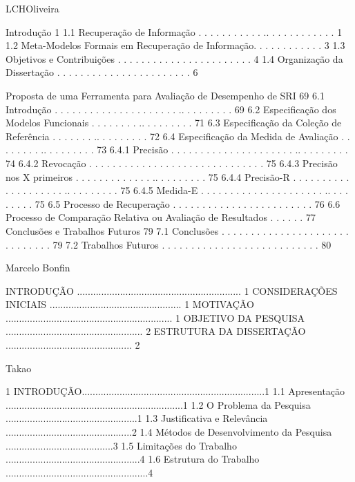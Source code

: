 LCHOliveira

Introdução 1
1.1 Recuperação de Informação . . . . . . . . . . . .. . . . . . . . . . . . 1
1.2 Meta-Modelos Formais em Recuperação de Informação. . . . . . . . . . . . 3
1.3 Objetivos e Contribuições  . . . . . . . . . . . . . . . . . . . . . . . 4
1.4 Organização da Dissertação . . . . . . . . . . . . . . . . . . . . . . . 6

Proposta de uma Ferramenta para Avaliação de Desempenho de SRI 69
6.1 Introdução . . . . . . . . . . . . . . . . . . . . . .. . . . . . . . . 69
6.2 Especificação dos Modelos Funcionais . . . . . . . . .. . . . . . . . . 71
6.3 Especificação da Coleção de Referência . . . . . . . .. . . . . . . . . 72
6.4 Especificação da Medida de Avaliação . . . . . . . . .. . . . . . . . . 73
6.4.1 Precisão . . . . . . . . . . . . . . . . . . . . . .. . . . . . . . . 74
6.4.2 Revocação . . . . . . . . . . . . . . . . . . . . . . . . . . . . . . 75
6.4.3 Precisão nos X primeiros . . . . . . . . . . . . . .. . . . . . . . . 75
6.4.4 Precisão-R . . . . . . . . . . . . . . . . . . . . .. . . . . . . . . 75
6.4.5 Medida-E . . . . . . . . . . . . . . . . . . . . . .. . . . . . . . . 75
6.5 Processo de Recuperação . . . . . . . . . . . . . . . . . . . . . . . . 76
6.6 Processo de Comparação Relativa ou Avaliação de Resultados  . . . . . . 77
Conclusões e Trabalhos Futuros 79
7.1 Conclusões . . . . . . . . . . . . . . . . . . . . . . . .  . . . . . . 79
7.2 Trabalhos Futuros . . . . . . . . . . . . . . . . . . . . . . . . . . . 80




Marcelo Bonfin

INTRODUÇÃO ............................................................. 1
CONSIDERAÇÕES INICIAIS ................................................. 1
MOTIVAÇÃO .............................................................. 1
OBJETIVO DA PESQUISA ................................................... 2
ESTRUTURA DA DISSERTAÇÃO ............................................... 2





Takao

1 INTRODUÇÃO....................................................................1
1.1 Apresentação ..................................................................1
1.2 O Problema da Pesquisa .................................................1
1.3 Justificativa e Relevância ...............................................2
1.4 Métodos de Desenvolvimento da Pesquisa ........................................3
1.5 Limitações do Trabalho ..................................................4
1.6 Estrutura do Trabalho .....................................................4

